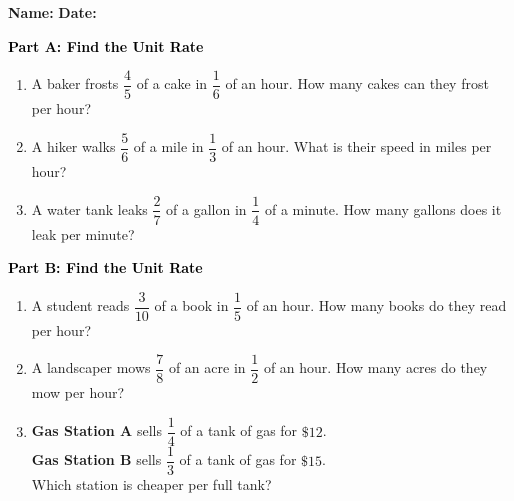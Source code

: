 \documentclass[12pt, letterpaper, fleqn]{article}
\begin{document}
\textbf{Name:} \underline{\hspace{5cm}}
\hfill
\textbf{Date:} \underline{\hspace{3cm}}\\

\begin{tcolorbox}[colback=customteal!20]
\large\textcolor{black}{\textbf{Part A: Find the Unit Rate}}
\end{tcolorbox}

\vspace{3mm}

\begin{enumerate}[itemsep=5.5cm, leftmargin=0.6cm]
\item A baker frosts $\dfrac{4}{5}$ of a cake in $\dfrac{1}{6}$ of an hour. How many cakes can they frost per hour?
\item A hiker walks $\dfrac{5}{6}$ of a mile in $\dfrac{1}{3}$ of an hour. What is their speed in miles per hour?
\item A water tank leaks $\dfrac{2}{7}$ of a gallon in $\dfrac{1}{4}$ of a minute. How many gallons does it leak per minute?
\end{enumerate}

\newpage

\begin{tcolorbox}[colback=customteal!20]
\large\textcolor{black}{\textbf{Part B: Find the Unit Rate}}
\end{tcolorbox}

\vspace{3mm}

\begin{enumerate}[itemsep=5.5cm, leftmargin=0.6cm, resume]
\item A student reads $\dfrac{3}{10}$ of a book in $\dfrac{1}{5}$ of an hour. How many books do they read per hour?
\item A landscaper mows $\dfrac{7}{8}$ of an acre in $\dfrac{1}{2}$ of an hour. How many acres do they mow per hour?
\item \textbf{Gas Station A} sells $\dfrac{1}{4}$ of a tank of gas for $\$12$. \\
\textbf{Gas Station B} sells $\dfrac{1}{3}$ of a tank of gas for $\$15$. \\
Which station is cheaper per full tank?
\end{enumerate}
\end{document}
